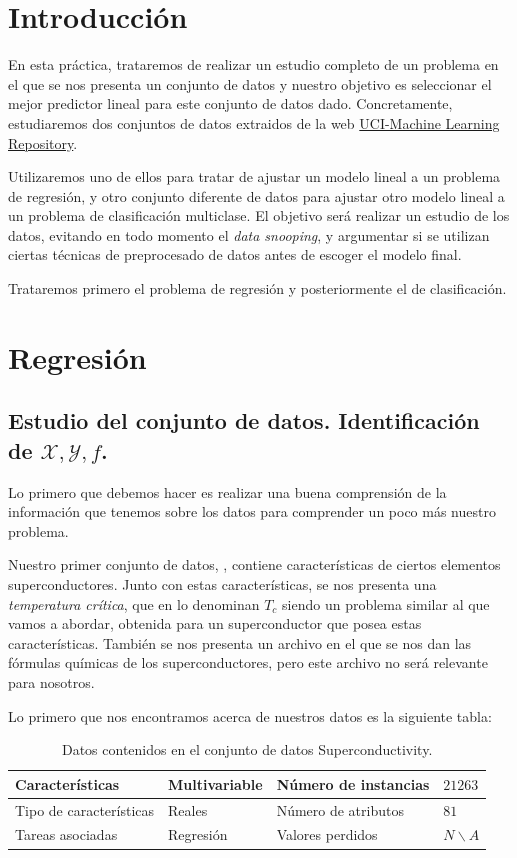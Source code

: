 \documentclass[a4paper, 20pt]{article}
\begin{document}
\section*{Introducción}

En esta práctica, trataremos de realizar un estudio completo de un problema en el que se nos
presenta un conjunto de datos y nuestro objetivo es seleccionar el mejor predictor lineal para
este conjunto de datos dado. Concretamente, estudiaremos dos conjuntos de datos extraidos
de la web \href{https://archive.ics.uci.edu/ml/index.php}{UCI-Machine Learning Repository}.

Utilizaremos uno de ellos para tratar de ajustar un modelo lineal a un problema de regresión, y otro conjunto diferente de datos para ajustar otro modelo lineal a un problema de clasificación multiclase. El objetivo será realizar un estudio de los datos, evitando en todo momento el \emph{data snooping}, y argumentar si se utilizan ciertas técnicas de preprocesado de datos antes de escoger el modelo final.

Trataremos primero el problema de regresión y posteriormente el de clasificación.

\section{Regresión}

\subsection{Estudio del conjunto de datos. Identificación de $\mathcal X,\mathcal Y,f$.}

Lo primero que debemos hacer es realizar una buena comprensión de la información que tenemos sobre los datos para comprender un poco más nuestro problema.

Nuestro primer conjunto de datos, \cite{superdata}, contiene características de ciertos elementos superconductores. Junto con estas características, se nos presenta una \emph{temperatura crítica}, que en \cite{hamidieh} lo denominan $T_c$ siendo un problema similar al que vamos a abordar, obtenida para un superconductor que posea estas características. También se nos presenta un archivo en el que se nos dan las fórmulas químicas de los superconductores, pero este archivo no será relevante para nosotros.

Lo primero que nos encontramos acerca de nuestros datos es la siguiente tabla:
\begin{table}[h]
  \centering
  \begin{tabular}{|l|l|l|l|}
    \hline
    Características         & Multivariable & Número de instancias & $21263$ \\ \hline
    Tipo de características & Reales        & Número de atributos  & $81$    \\ \hline
    Tareas asociadas        & Regresión     & Valores perdidos     & $N\backslash A$   \\ \hline
  \end{tabular}
  \caption{Datos contenidos en el conjunto de datos Superconductivity.}
\end{table}
\end{document}
